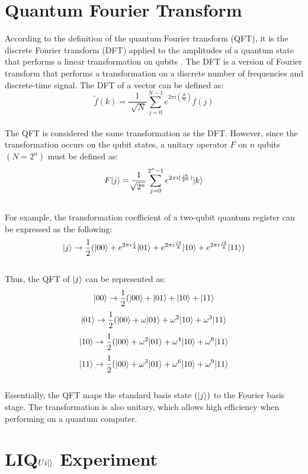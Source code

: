 \documentclass[12pt]{third-rep}
\begin{document}
\chapter{Quantum Fourier Transform}

According to the definition of the quantum Fourier transform (QFT), it is the discrete Fourier transform (DFT) applied to the amplitudes of a quantum state that performs a linear transformation on qubits \cite{washington}. The DFT is a version of Fourier transform that performs a transformation on a discrete number of frequencies and discrete-time signal. The DFT of a vector can be defined as:
$$\tilde{f}(k)=\frac{1}{\sqrt[]{N}}\sum_{j=0}^{N-1}e^{2\pi i(\frac{jk}{N})}f(j)$$ \\
The QFT is considered the same transformation as the DFT. However, since the transformation occurs on the qubit states, a unitary operator $F$ on $n$ qubits $(N=2^n)$ must be defined as:
$$F{\left\vert{j}\right\rangle}=\frac{1}{\sqrt[]{2^n}}\sum_{j=0}^{2^n-1}e^{2\pi i(\frac{jk}{2^n})}{\left\vert{k}\right\rangle}$$\\
For example, the transformation coefficient of a two-qubit quantum register can be expressed as the following:
$${\left\vert{j}\right\rangle}\rightarrow\frac{1}{2}({\left\vert{00}\right\rangle}+e^{2\pi i\frac{j}{4}}{\left\vert{01}\right\rangle}+e^{2\pi i\frac{j2}{4}}{\left\vert{10}\right\rangle}+e^{2\pi i\frac{j3}{4}}{\left\vert{11}\right\rangle})$$ \\
Thus, the QFT of ${\left\vert{j}\right\rangle}$ can be represented as:
$${\left\vert{00}\right\rangle}\rightarrow\frac{1}{2}({\left\vert{00}\right\rangle}+{\left\vert{01}\right\rangle}+{\left\vert{10}\right\rangle}+{\left\vert{11}\right\rangle}$$
$${\left\vert{01}\right\rangle}\rightarrow\frac{1}{2}({\left\vert{00}\right\rangle}+\omega{\left\vert{01}\right\rangle}+\omega^2{\left\vert{10}\right\rangle}+\omega^3{\left\vert{11}\right\rangle}$$
$${\left\vert{10}\right\rangle}\rightarrow\frac{1}{2}({\left\vert{00}\right\rangle}+\omega^2{\left\vert{01}\right\rangle}+\omega^4{\left\vert{10}\right\rangle}+\omega^6{\left\vert{11}\right\rangle}$$
$${\left\vert{11}\right\rangle}\rightarrow\frac{1}{2}({\left\vert{00}\right\rangle}+\omega^3{\left\vert{01}\right\rangle}+\omega^6{\left\vert{10}\right\rangle}+\omega^9{\left\vert{11}\right\rangle}$$ \\
Essentially, the QFT maps the standard basis state $({\left\vert{j}\right\rangle})$ to the Fourier basis stage. The transformation is also unitary, which allows high efficiency when performing on a quantum computer.

\chapter{LIQ$Ui{\left\vert{}\right\rangle}$ Experiment}
\end{document}
